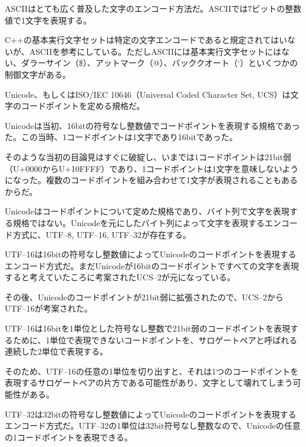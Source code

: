 
ASCIIはとても広く普及した文字のエンコード方法だ。ASCIIでは7ビットの整数値で1文字を表現する。

C++の基本実行文字セットは特定の文字エンコードであると規定されてはいないが、ASCIIを参考にしている。ただしASCIIには基本実行文字セットにはない、ダラーサイン（\$）、アットマーク（@）、バッククオート（`）といくつかの制御文字がある。


Unicode、もしくはISO/IEC 10646（Universal Coded Character Set, UCS）は文字のコードポイントを定める規格だ。

Unicodeは当初、16bitの符号なし整数値でコードポイントを表現する規格であった。この当時、1コードポイントは1文字であり16bitであった。

そのような当初の目論見はすぐに破綻し、いまでは1コードポイントは21bit弱（U+0000からU+10FFFF）であり、1コードポイントは1文字を意味しないようになった。複数のコードポイントを組み合わせて1文字が表現されることもあるからだ。

Unicodeはコードポイントについて定めた規格であり、バイト列で文字を表現する規格ではない。Unicodeを元にしたバイト列によって文字を表現するエンコード方式に、UTF--8, UTF--16, UTF--32が存在する。


UTF--16は16bitの符号なし整数値によってUnicodeのコードポイントを表現するエンコード方式だ。まだUnicodeが16bitのコードポイントですべての文字を表現すると考えていたころに考案されたUCS--2が元になっている。

その後、Unicodeのコードポイントが21bit弱に拡張されたので、UCS--2からUTF--16が考案された。

UTF--16は16bitを1単位とした符号なし整数で21bit弱のコードポイントを表現するために、1単位で表現できないコードポイントを、サロゲートペアと呼ばれる連続した2単位で表現する。

そのため、UTF--16の任意の1単位を切り出すと、それは1つのコードポイントを表現するサロゲートペアの片方である可能性があり、文字として壊れてしまう可能性がある。


UTF--32は32bitの符号なし整数値によってUnicodeのコードポイントを表現するエンコード方式だ。UTF--32の1単位は32bit符号なし整数なので、Unicodeの任意の1コードポイントを表現できる。

